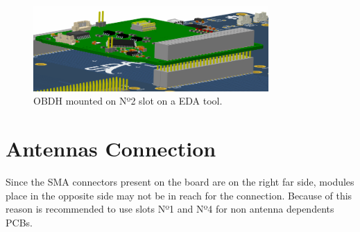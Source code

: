 \begin{figure}[!ht]
    \begin{center}
        \includegraphics[width=0.8\textwidth]{figures/obdh2_mouting.png}
        \caption{OBDH mounted on Nº2 slot on a EDA tool.}
        \label{fig:obdh2-mouting}
    \end{center}
\end{figure}

\section{Antennas Connection}

Since the SMA connectors present on the board are on the right far side, modules place in the opposite side may not be in reach for the connection. Because of this reason is recommended to use slots Nº1 and Nº4 for non antenna dependents PCBs.